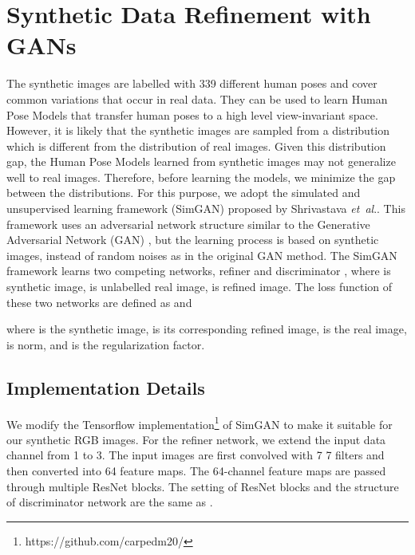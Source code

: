 \documentclass[twocolumn]{svjour3}          \smartqed  \usepackage{graphicx}
\newcommand{\etal}{\textit{et~al}.}
\begin{document}
\section{Synthetic Data Refinement with GANs}
\label{sec:GAN}

The synthetic images are labelled with 339 different human poses and cover common variations that occur in real data. They can be used to learn Human Pose Models that transfer human poses to a high level view-invariant space. However, it is likely that the synthetic images are sampled from a distribution which is different from the distribution of real images. Given this distribution gap, the Human Pose Models learned from synthetic images may not generalize well to real images. Therefore, before learning the models, we minimize the gap between the distributions. For this purpose, we adopt the simulated and unsupervised learning framework (SimGAN) \citep{shrivastava2016learning} proposed by Shrivastava \etal. This framework uses an adversarial network structure similar to the Generative Adversarial Network (GAN) \citep{goodfellow2014generative}, but the learning process is based on synthetic images, instead of random noises as in the original GAN method. The SimGAN framework learns two competing networks, refiner  and discriminator , where  is synthetic image,  is unlabelled real image,  is refined image. The loss function of these two networks are defined as  and  \citep{shrivastava2016learning}

 \vspace{-5mm}
 
where  is the  synthetic image,  is its corresponding refined image,  is the  real image,  is  norm, and  is the regularization factor.

\subsection{Implementation Details}

We modify the Tensorflow implementation\footnote{https://github.com/carpedm20/} of SimGAN to make it suitable for our synthetic RGB images. For the refiner network, we extend the input data channel from 1 to 3. The input images are first convolved with 7  7 filters and then converted into 64 feature maps. The 64-channel feature maps are passed through multiple ResNet blocks. The setting of ResNet blocks and the structure of discriminator network are the same as \citep{shrivastava2016learning}.
\end{document}

